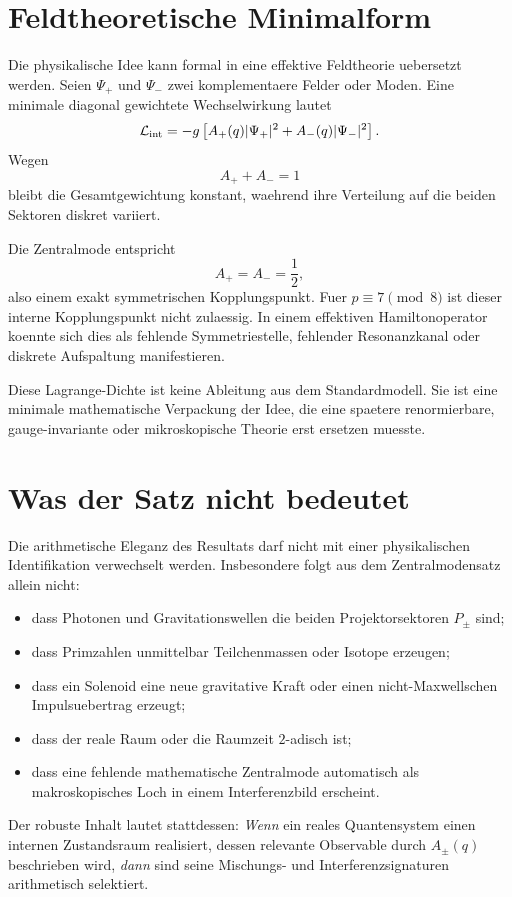 \documentclass[11pt,a4paper]{article}
\theoremstyle{definition}
\begin{document}
\section{Feldtheoretische Minimalform}
Die physikalische Idee kann formal in eine effektive Feldtheorie uebersetzt werden. Seien $\Psi_+$ und $\Psi_-$ zwei komplementaere Felder oder Moden. Eine minimale diagonal gewichtete Wechselwirkung lautet
\[
\mathcal L_{\rm int}
=-g\left[A_+(q)|\Psi_+|^2+A_-(q)|\Psi_-|^2\right].
\]
Wegen
\[
A_++A_-=1
\]
bleibt die Gesamtgewichtung konstant, waehrend ihre Verteilung auf die beiden Sektoren diskret variiert.

Die Zentralmode entspricht
\[
A_+=A_-=\frac12,
\]
also einem exakt symmetrischen Kopplungspunkt. Fuer $p\equiv7\pmod8$ ist dieser interne Kopplungspunkt nicht zulaessig. In einem effektiven Hamiltonoperator koennte sich dies als fehlende Symmetriestelle, fehlender Resonanzkanal oder diskrete Aufspaltung manifestieren.

Diese Lagrange-Dichte ist keine Ableitung aus dem Standardmodell. Sie ist eine minimale mathematische Verpackung der Idee, die eine spaetere renormierbare, gauge-invariante oder mikroskopische Theorie erst ersetzen muesste.

\section{Was der Satz nicht bedeutet}
Die arithmetische Eleganz des Resultats darf nicht mit einer physikalischen Identifikation verwechselt werden. Insbesondere folgt aus dem Zentralmodensatz allein nicht:
\begin{itemize}[leftmargin=1.7em]
\item dass Photonen und Gravitationswellen die beiden Projektorsektoren $P_\pm$ sind;
\item dass Primzahlen unmittelbar Teilchenmassen oder Isotope erzeugen;
\item dass ein Solenoid eine neue gravitative Kraft oder einen nicht-Maxwellschen Impulsuebertrag erzeugt;
\item dass der reale Raum oder die Raumzeit $2$-adisch ist;
\item dass eine fehlende mathematische Zentralmode automatisch als makroskopisches Loch in einem Interferenzbild erscheint.
\end{itemize}

Der robuste Inhalt lautet stattdessen: \emph{Wenn} ein reales Quantensystem einen internen Zustandsraum realisiert, dessen relevante Observable durch $A_\pm(q)$ beschrieben wird, \emph{dann} sind seine Mischungs- und Interferenzsignaturen arithmetisch selektiert.
\end{document}
